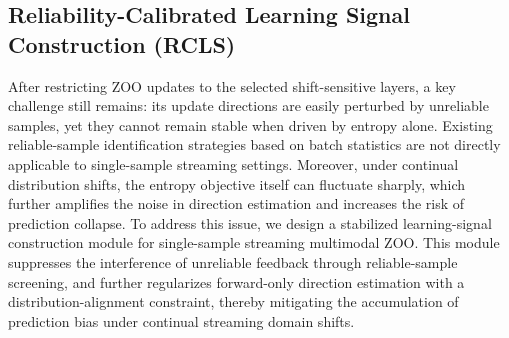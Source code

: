 \subsection{Reliability-Calibrated Learning Signal Construction (RCLS)}
\label{sec:rcls}

After restricting ZOO updates to the selected shift-sensitive layers, a key challenge still remains:
its update directions are easily perturbed by unreliable samples, yet they cannot remain stable when driven by entropy alone.
Existing reliable-sample identification strategies based on batch statistics are not directly applicable to single-sample streaming settings.
Moreover, under continual distribution shifts, the entropy objective itself can fluctuate sharply, which further amplifies the noise in direction estimation and increases the risk of prediction collapse.
To address this issue, we design a stabilized learning-signal construction module for single-sample streaming multimodal ZOO.
This module suppresses the interference of unreliable feedback through reliable-sample screening, and further regularizes forward-only direction estimation with a distribution-alignment constraint, thereby mitigating the accumulation of prediction bias under continual streaming domain shifts.

